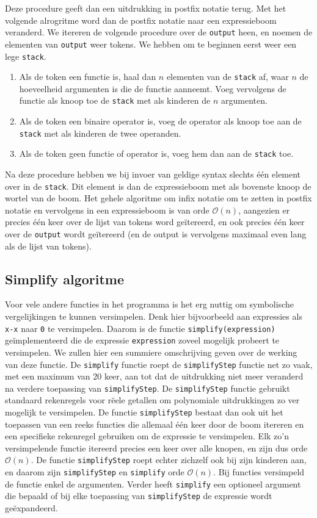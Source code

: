\documentclass[a4paper]{article}
\newcommand{\ttt}[1]{\texttt{#1}}
\begin{document}
Deze procedure geeft dan een uitdrukking in postfix notatie terug. Met het volgende alrogritme word dan de postfix notatie naar een expressieboom veranderd. We itereren de volgende procedure over de \ttt{output} heen, en noemen de elementen van \ttt{output} weer tokens. We hebben om te beginnen eerst weer een lege \ttt{stack}.
\begin{enumerate}
\item Als de token een functie is, haal dan $n$ elementen van de \ttt{stack} af, waar $n$ de hoeveelheid argumenten is die de functie aanneemt. Voeg vervolgens de functie als knoop toe de \ttt{stack} met als kinderen de $n$ argumenten. 
\item Als de token een binaire operator is, voeg de operator als knoop toe aan de \ttt{stack} met als kinderen de twee operanden.
\item Als de token geen functie of operator is, voeg hem dan aan de \ttt{stack} toe.
\end{enumerate}
Na deze procedure hebben we bij invoer van geldige syntax slechts \'e\'en element over in de \ttt{stack}. Dit element is dan de expressieboom met als bovenste knoop de wortel van de boom. Het gehele algoritme om infix notatie om te zetten in postfix notatie en vervolgens in een expressieboom is van orde $\mathcal{O}(n)$, aangezien er precies \'e\'en keer over de lijst van tokens word ge\"itereerd, en ook precies \'e\'en keer over de \ttt{output} wordt ge\"itereerd (en de output is vervolgens maximaal even lang als de lijst van tokens).

\subsection{Simplify algoritme}
Voor vele andere functies in het programma is het erg nuttig om symbolische vergelijkingen te kunnen versimpelen. Denk hier bijvoorbeeld aan expressies als \ttt{x-x} naar \ttt{0} te versimpelen. Daarom is de functie \ttt{simplify(expression)} ge\"implementeerd die de expressie \ttt{expression} zoveel mogelijk probeert te versimpelen. We zullen hier een summiere omschrijving geven over de werking van deze functie. De \ttt{simplify} functie roept de \ttt{simplifyStep} functie net zo vaak, met een maximum van 20 keer, aan tot dat de uitdrukking niet meer veranderd na verdere toepassing van \ttt{simplifyStep}. De \ttt{simplifyStep} functie gebruikt standaard rekenregels voor r\"eele getallen om polynomiale uitdrukkingen zo ver mogelijk te versimpelen. De functie \ttt{simplifyStep} bestaat dan ook uit het toepassen van een reeks functies die allemaal \'e\'en keer door de boom itereren en een specifieke rekenregel gebruiken om de expressie te versimpelen. Elk zo'n versimpelende functie itereerd precies een keer over alle knopen, en zijn dus orde $\mathcal O(n)$. De functie \ttt{simplifyStep} roept echter zichzelf ook bij zijn kinderen aan, en daarom zijn \ttt{simplifyStep} en \ttt{simplify} orde $\mathcal O(n)$. Bij functies versimpeld de functie enkel de argumenten. Verder heeft \ttt{simplify} een optioneel argument die bepaald of bij elke toepassing van \ttt{simplifyStep} de expressie wordt ge\"expandeerd. 
\end{document}
